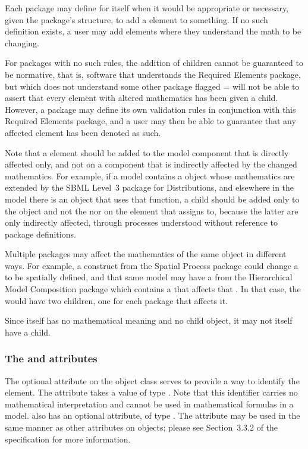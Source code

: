 Each package may define for itself when it would be appropriate or necessary, given the package's structure, to add a \ChangedMath element to something.  If no such definition exists, a user may add \ChangedMath elements where they understand the math to be changing.

For packages with no such rules, the addition of \ChangedMath children cannot be guaranteed to be normative, that is, software that understands the Required Elements package, but which does not understand some other package flagged = will not be able to assert that every element with altered mathematics has been given a \ChangedMath child.  However, a package may define its own validation rules in conjunction with this Required Elements package, and a user may then be able to guarantee that any affected element has been denoted as such.

Note that a \ChangedMath element should be added to the model component that is directly affected only, and not on a component that is indirectly affected by the changed mathematics.  For example, if a model contains a \FunctionDefinition object whose mathematics are extended by the SBML Level~3 package for Distributions, and elsewhere in the model there is an \InitialAssignment object that uses that function, a \ChangedMath child should be added only to the \FunctionDefinition object and not the \InitialAssignment nor on the element that assigns to, because the latter are only indirectly affected, through processes understood without reference to package definitions.

Multiple packages may affect the mathematics of the same object in different ways.  For example, a construct from the Spatial Process package could change a \Species to be spatially defined, and that same model may have a \Submodel from the Hierarchical Model Composition package which contains a \Reaction that affects that \Species.  In that case, the \Species would have two \ChangedMath children, one for each package that affects it.

Since \ChangedMath itself has no mathematical meaning and no child \Math object, it may not itself have a \ChangedMath child.

\subsubsection{The \fixttspace{} and \fixttspace{} attributes}
\label{idname-attributes}

The optional  attribute on the \ChangedMath object class serves to provide a way to identify the element.  The attribute takes a value of type .  Note that this identifier carries no mathematical interpretation and cannot be used in mathematical formulas in a model.  \ChangedMath also has an optional  attribute, of type .  The  attribute may be used in the same manner as other  attributes on \sbmlthreecore objects; please see Section~3.3.2 of the \sbmlthreecore specification for more information.


